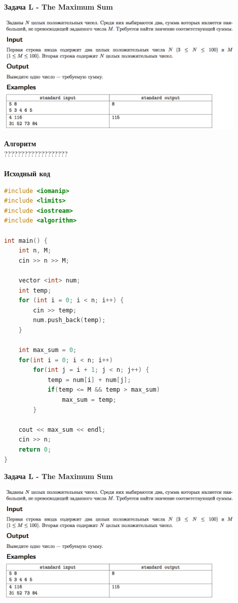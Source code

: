 \documentclass[a4paper,12pt]{article}
\begin{document}
\textbf{{\large Задача L - The Maximum Sum}} \\
\begin{center}
\includegraphics[width=0.9\textwidth]{OC_Japan/OC_Japan_L.png}\\ [1cm]
\end{center}
\newpage

\textbf{{\large Алгоритм}} \\
{\Huge ???????????????????} \\ 
\\
\textbf{{\large Исходный код}}
\begin{lstlisting}[language=C++]
#include <iomanip>
#include <limits>
#include <iostream>
#include <algorithm>

int main() {
    int n, M;
	cin >> n >> M;

	vector <int> num;
	int temp;
	for (int i = 0; i < n; i++) {
		cin >> temp;
		num.push_back(temp);
	}

	int max_sum = 0;
	for(int i = 0; i < n; i++)
		for(int j = i + 1; j < n; j++) {
			temp = num[i] + num[j];
			if(temp <= M && temp > max_sum)
				max_sum = temp;
		}

	cout << max_sum << endl;
    cin >> n;
    return 0;
}
\end{lstlisting}

\textbf{{\large Задача L - The Maximum Sum}} \\
\begin{center}
\includegraphics[width=0.9\textwidth]{OC_Japan/OC_Japan_L.png}\\ [1cm]
\end{center}
\newpage
\end{document}
